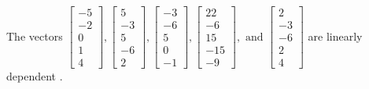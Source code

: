 \begin{exercise}
\begin{exerciseStatement}
  \end{exerciseStatement}
  \begin{exerciseAnswer}
   The vectors \(\left[\begin{array}{r}
-5 \\
-2 \\
0 \\
1 \\
4
\end{array}\right] , \left[\begin{array}{r}
5 \\
-3 \\
5 \\
-6 \\
2
\end{array}\right] , \left[\begin{array}{r}
-3 \\
-6 \\
5 \\
0 \\
-1
\end{array}\right] , \left[\begin{array}{r}
22 \\
-6 \\
15 \\
-15 \\
-9
\end{array}\right] , \text{ and } \left[\begin{array}{r}
2 \\
-3 \\
-6 \\
2 \\
4
\end{array}\right]\) are 
  	 linearly dependent  .
  


  \end{exerciseAnswer}
\end{exercise}
